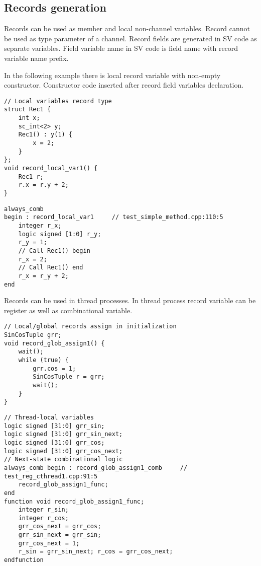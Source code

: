 \subsection{Records generation}\label{section:record_gen}

Records can be used as member and local non-channel variables. Record cannot be used as type parameter of a channel. Record fields are generated in SV code as separate variables. Field variable name in SV code is field name with record variable name prefix.

In the following example there is local record variable with non-empty constructor. Constructor code inserted after record field variables declaration.
%
\begin{lstlisting}[style=mycpp]
// Local variables record type
struct Rec1 {
    int x;
    sc_int<2> y;       
    Rec1() : y(1) {
        x = 2;
    }
};
void record_local_var1() {
    Rec1 r;
    r.x = r.y + 2;
}
\end{lstlisting}
%
\begin{lstlisting}[style=myverilog]
always_comb 
begin : record_local_var1     // test_simple_method.cpp:110:5
    integer r_x;
    logic signed [1:0] r_y;
    r_y = 1;
    // Call Rec1() begin
    r_x = 2;
    // Call Rec1() end
    r_x = r_y + 2;
end
\end{lstlisting}

Records can be used in thread processes. In thread process record variable can be register as well as combinational variable. 

\begin{lstlisting}[style=mycpp]
// Local/global records assign in initialization
SinCosTuple grr;
void record_glob_assign1() {
    wait();
    while (true) {
        grr.cos = 1;
        SinCosTuple r = grr;
        wait();
    }
}
\end{lstlisting}
%
\begin{lstlisting}[style=myverilog]
// Thread-local variables
logic signed [31:0] grr_sin;
logic signed [31:0] grr_sin_next;
logic signed [31:0] grr_cos;
logic signed [31:0] grr_cos_next;
// Next-state combinational logic
always_comb begin : record_glob_assign1_comb     // test_reg_cthread1.cpp:91:5
    record_glob_assign1_func;
end
function void record_glob_assign1_func;
    integer r_sin;
    integer r_cos;
    grr_cos_next = grr_cos;
    grr_sin_next = grr_sin;
    grr_cos_next = 1;
    r_sin = grr_sin_next; r_cos = grr_cos_next;
endfunction
\end{lstlisting}




